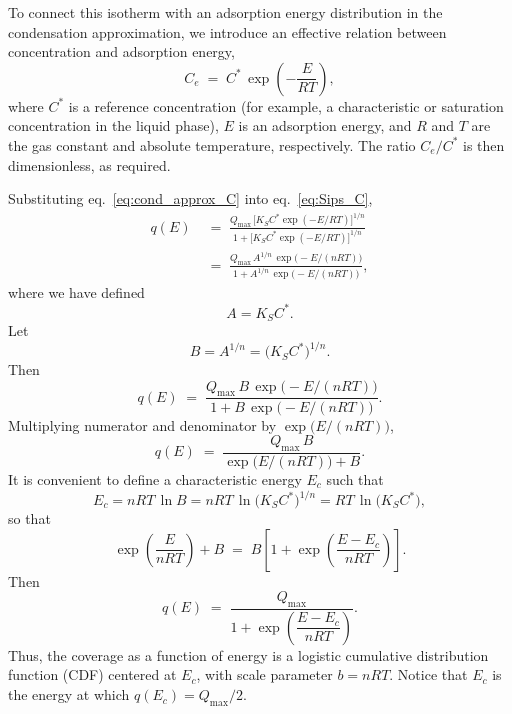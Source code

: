 	To connect this isotherm with an adsorption energy distribution in the
	condensation approximation, we introduce an effective relation between
	concentration and adsorption energy,
	\begin{equation}
		C_e
		\;=\;
		C^{\ast}\,\exp\!\left(-\frac{E}{RT}\right),
		\label{eq:cond_approx_C}
	\end{equation}
	where \(C^{\ast}\) is a reference concentration (for example, a
	characteristic or saturation concentration in the liquid phase), \(E\) is
	an adsorption energy, and \(R\) and \(T\) are the gas constant and absolute
	temperature, respectively. The ratio \(C_e/C^{\ast}\) is then
	dimensionless, as required.
	
	Substituting eq.~\eqref{eq:cond_approx_C} into eq.~\eqref{eq:Sips_C},
	\begin{align}
		q(E)
		\;&=\;
		\frac{Q_{\max}\,\bigl[K_S C^{\ast}\exp(-E/RT)\bigr]^{1/n}}
		{1 + \bigl[K_S C^{\ast}\exp(-E/RT)\bigr]^{1/n}}
		\nonumber\\[4pt]
		\;&=\;
		\frac{Q_{\max}\,A^{1/n}\,\exp\bigl(-E/(nRT)\bigr)}
		{1 + A^{1/n}\,\exp\bigl(-E/(nRT)\bigr)},
	\end{align}
	where we have defined
	\begin{equation}
		A = K_S C^{\ast}.
	\end{equation}
	Let
	\begin{equation}
		B = A^{1/n} = \bigl(K_S C^{\ast}\bigr)^{1/n}.
	\end{equation}
	Then
	\begin{equation}
		q(E)
		\;=\;
		\frac{Q_{\max}\,B\,\exp\bigl(-E/(nRT)\bigr)}
		{1 + B\,\exp\bigl(-E/(nRT)\bigr)}.
	\end{equation}
	Multiplying numerator and denominator by \(\exp\bigl(E/(nRT)\bigr)\),
	\begin{equation}
		q(E)
		\;=\;
		\frac{Q_{\max}\,B}
		{\exp\bigl(E/(nRT)\bigr) + B}.
	\end{equation}
	It is convenient to define a characteristic energy \(E_c\) such that
	\begin{equation}
		E_c = nRT\,\ln B
		= nRT\,\ln\bigl(K_S C^{\ast}\bigr)^{1/n}
		= RT\,\ln\bigl(K_S C^{\ast}\bigr),
	\end{equation}
	so that
	\begin{equation}
		\exp\!\left(\frac{E}{nRT}\right) + B
		\;=\;
		B\left[1 + \exp\!\left(\frac{E - E_c}{nRT}\right)\right].
	\end{equation}
	Then
	\begin{equation}
		q(E)
		\;=\;
		\frac{Q_{\max}}
		{1 + \exp\!\left(\dfrac{E - E_c}{nRT}\right)}.
		\label{eq:qE_logistic_conc}
	\end{equation}
	Thus, the coverage as a function of energy is a logistic cumulative
	distribution function (CDF) centered at \(E_c\), with scale parameter
	\(b = nRT\). Notice that \(E_c\) is the energy at which \(q(E_c) = Q_{\max}/2\).
	
